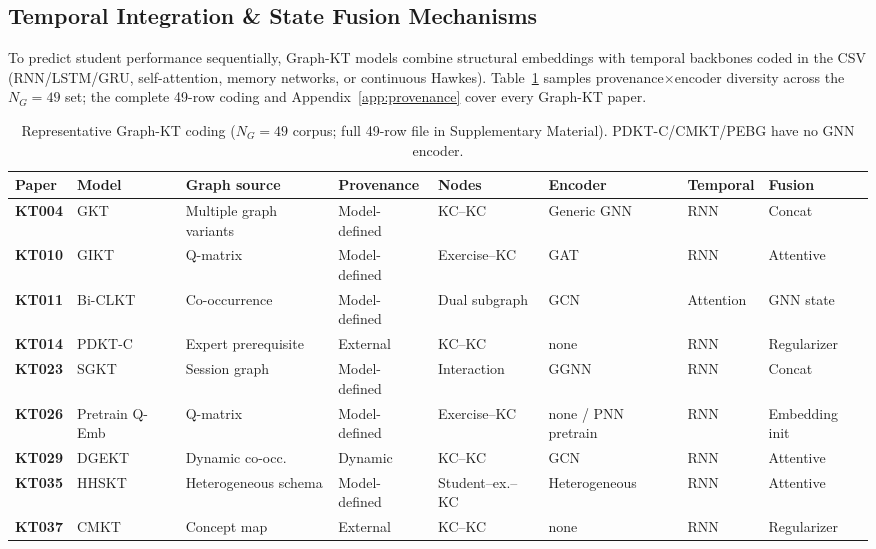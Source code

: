 \documentclass[lettersize,journal]{IEEEtran}
\begin{document}
\subsection{Temporal Integration \& State Fusion Mechanisms}
To predict student performance sequentially, Graph-KT models combine structural embeddings with temporal backbones coded in the CSV (RNN/LSTM/GRU, self-attention, memory networks, or continuous Hawkes). Table~\ref{tab:graph_taxonomy} samples provenance$\times$encoder diversity across the $N_G=49$ set; the complete 49-row coding and Appendix~\ref{app:provenance} cover every Graph-KT paper.
\begin{table}[t]
\caption{Representative Graph-KT coding ($N_G=49$ corpus; full 49-row file in Supplementary Material). PDKT-C/CMKT/PEBG have no GNN encoder.}
\label{tab:graph_taxonomy}
\centering
\footnotesize
\setlength{\tabcolsep}{3.5pt}
\begin{tabular}{@{}ll>{\raggedright\arraybackslash}p{2.15cm}l>{\raggedright\arraybackslash}p{1.55cm}lll@{}}
\toprule
\textbf{Paper} & \textbf{Model} & \textbf{Graph source} & \textbf{Provenance} & \textbf{Nodes} & \textbf{Encoder} & \textbf{Temporal} & \textbf{Fusion} \\
\midrule
\textbf{KT004} & GKT \cite{KT004_GKT_2019} & Multiple graph variants & Model-defined & KC--KC & Generic GNN & RNN & Concat \\
\textbf{KT010} & GIKT \cite{KT010_GIKT_2021} & Q-matrix & Model-defined & Exercise--KC & GAT & RNN & Attentive \\
\textbf{KT011} & Bi-CLKT \cite{KT011_BiCLKT_2022} & Co-occurrence & Model-defined & Dual subgraph & GCN & Attention & GNN state \\
\textbf{KT014} & PDKT-C \cite{KT014_PDKTC_2018} & Expert prerequisite & External & KC--KC & none & RNN & Regularizer \\
\textbf{KT023} & SGKT \cite{KT023_SGKT_2022} & Session graph & Model-defined & Interaction & GGNN & RNN & Concat \\
\textbf{KT026} & Pretrain Q-Emb \cite{KT026_PretrainQ_2020} & Q-matrix & Model-defined & Exercise--KC & none / PNN pretrain & RNN & Embedding init \\
\textbf{KT029} & DGEKT \cite{KT029_DGEKT_2024} & Dynamic co-occ. & Dynamic & KC--KC & GCN & RNN & Attentive \\
\textbf{KT035} & HHSKT \cite{KT035_HHSKT_2023} & Heterogeneous schema & Model-defined & Student--ex.--KC & Heterogeneous & RNN & Attentive \\
\textbf{KT037} & CMKT \cite{KT037_CMKT_2022} & Concept map & External & KC--KC & none & RNN & Regularizer \\

\end{tabular}
\end{table}
\end{document}
